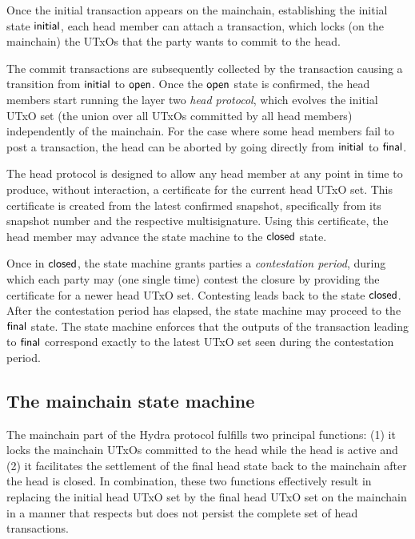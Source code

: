 Once the initial transaction appears on the mainchain, establishing
the initial state $\mathsf{initial}$, each head member can attach a
\mtxCom{} transaction, which locks (on the mainchain) the UTxOs that
the party wants to commit to the head.

The commit transactions are subsequently collected by the \mtxCCom{} transaction
causing a transition from $\mathsf{initial}$ to $\mathsf{open}$. Once the $\mathsf{open}$ state is
confirmed, the head members start running the layer two \emph{head protocol},
which evolves the initial UTxO set (the union over all UTxOs committed by all
head members) independently of the mainchain. For the case where some head
members fail to post a \mtxCom{} transaction, the head can be aborted by going
directly from $\mathsf{initial}$ to $\mathsf{final}$.

The head protocol is designed to allow any head member
at any point in time to produce, without interaction, a certificate 
for the current head UTxO set.
This certificate is created from the latest confirmed snapshot,
specifically from its snapshot number and the respective multisignature.
Using this certificate, the head member
may advance the state machine to the $\mathsf{closed}$ state.

Once in $\mathsf{closed}$, the state machine grants parties a
\emph{contestation period}, during which each party may (one single
time) contest the closure by providing the certificate for a newer head
UTxO set.  Contesting leads back to the state $\mathsf{closed}$.
After the contestation period has elapsed, the state machine may proceed
to the $\mathsf{final}$ state.  The state machine enforces that the
outputs of the transaction leading to $\mathsf{final}$ correspond exactly to
the latest UTxO set seen during the contestation period.


\subsection{The mainchain state machine}\label{sec:overview_mc}

The mainchain part of the Hydra protocol fulfills two principal
functions: (1) it locks the mainchain UTxOs committed %
to the head while the head is active and (2) it facilitates the
settlement of the final head state back to the mainchain after the
head is closed. In combination, these two functions effectively result
in replacing the initial head UTxO set by the final head UTxO set on
the mainchain in a manner that respects but does not persist the
complete set of head transactions.

